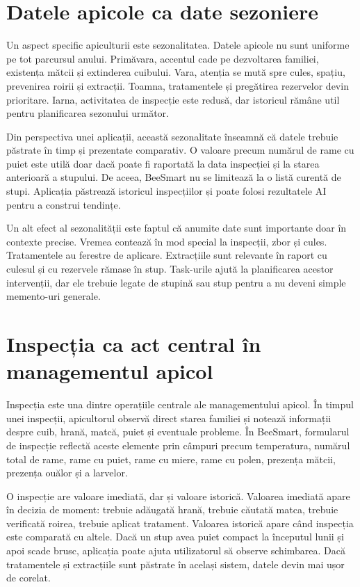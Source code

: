 \section{Datele apicole ca date sezoniere}

Un aspect specific apiculturii este sezonalitatea. Datele apicole nu sunt uniforme pe tot parcursul anului. Primăvara, accentul cade pe dezvoltarea familiei, existența mătcii și extinderea cuibului. Vara, atenția se mută spre cules, spațiu, prevenirea roirii și extracții. Toamna, tratamentele și pregătirea rezervelor devin prioritare. Iarna, activitatea de inspecție este redusă, dar istoricul rămâne util pentru planificarea sezonului următor.

Din perspectiva unei aplicații, această sezonalitate înseamnă că datele trebuie păstrate în timp și prezentate comparativ. O valoare precum numărul de rame cu puiet este utilă doar dacă poate fi raportată la data inspecției și la starea anterioară a stupului. De aceea, BeeSmart nu se limitează la o listă curentă de stupi. Aplicația păstrează istoricul inspecțiilor și poate folosi rezultatele AI pentru a construi tendințe.

Un alt efect al sezonalității este faptul că anumite date sunt importante doar în contexte precise. Vremea contează în mod special la inspecții, zbor și cules. Tratamentele au ferestre de aplicare. Extracțiile sunt relevante în raport cu culesul și cu rezervele rămase în stup. Task-urile ajută la planificarea acestor intervenții, dar ele trebuie legate de stupină sau stup pentru a nu deveni simple memento-uri generale.

\section{Inspecția ca act central în managementul apicol}

Inspecția este una dintre operațiile centrale ale managementului apicol. În timpul unei inspecții, apicultorul observă direct starea familiei și notează informații despre cuib, hrană, matcă, puiet și eventuale probleme. În BeeSmart, formularul de inspecție reflectă aceste elemente prin câmpuri precum temperatura, numărul total de rame, rame cu puiet, rame cu miere, rame cu polen, prezența mătcii, prezența ouălor și a larvelor.

O inspecție are valoare imediată, dar și valoare istorică. Valoarea imediată apare în decizia de moment: trebuie adăugată hrană, trebuie căutată matca, trebuie verificată roirea, trebuie aplicat tratament. Valoarea istorică apare când inspecția este comparată cu altele. Dacă un stup avea puiet compact la începutul lunii și apoi scade brusc, aplicația poate ajuta utilizatorul să observe schimbarea. Dacă tratamentele și extracțiile sunt păstrate în același sistem, datele devin mai ușor de corelat.

